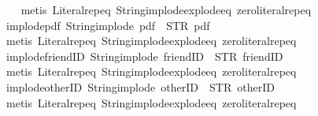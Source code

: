 \begin{isabellebody}
%
\isadelimproof
\ \ %
\endisadelimproof
%
\isatagproof
{}\isamarkupfalse%
\ {\isacharparenleft}metis\ Literal{\isachardot}rep{\isacharunderscore}eq\ String{\isachardot}implode{\isacharunderscore}explode{\isacharunderscore}eq\ zero{\isacharunderscore}literal{\isachardot}rep{\isacharunderscore}eq{\isacharparenright}%
\endisatagproof
{\isafoldproof}%
%
\isadelimproof
\isanewline
%
\endisadelimproof
\isanewline
{}\isamarkupfalse%
\ implode{\isacharunderscore}pdf{\isacharcolon}\ {\isachardoublequoteopen}String{\isachardot}implode\ {\isacharprime}{\isacharprime}pdf{\isacharprime}{\isacharprime}\ {\isacharequal}\ STR\ {\isacharprime}{\isacharprime}pdf{\isacharprime}{\isacharprime}{\isachardoublequoteclose}\isanewline
%
\isadelimproof
\ \ %
\endisadelimproof
%
\isatagproof
{}\isamarkupfalse%
\ {\isacharparenleft}metis\ Literal{\isachardot}rep{\isacharunderscore}eq\ String{\isachardot}implode{\isacharunderscore}explode{\isacharunderscore}eq\ zero{\isacharunderscore}literal{\isachardot}rep{\isacharunderscore}eq{\isacharparenright}%
\endisatagproof
{\isafoldproof}%
%
\isadelimproof
\isanewline
%
\endisadelimproof
\isanewline
{}\isamarkupfalse%
\ implode{\isacharunderscore}friendID{\isacharcolon}\ {\isachardoublequoteopen}String{\isachardot}implode\ {\isacharprime}{\isacharprime}friendID{\isacharprime}{\isacharprime}\ {\isacharequal}\ STR\ {\isacharprime}{\isacharprime}friendID{\isacharprime}{\isacharprime}{\isachardoublequoteclose}\isanewline
%
\isadelimproof
\ \ %
\endisadelimproof
%
\isatagproof
{}\isamarkupfalse%
\ {\isacharparenleft}metis\ Literal{\isachardot}rep{\isacharunderscore}eq\ String{\isachardot}implode{\isacharunderscore}explode{\isacharunderscore}eq\ zero{\isacharunderscore}literal{\isachardot}rep{\isacharunderscore}eq{\isacharparenright}%
\endisatagproof
{\isafoldproof}%
%
\isadelimproof
\isanewline
%
\endisadelimproof
\isanewline
{}\isamarkupfalse%
\ implode{\isacharunderscore}otherID{\isacharcolon}\ {\isachardoublequoteopen}String{\isachardot}implode\ {\isacharprime}{\isacharprime}otherID{\isacharprime}{\isacharprime}\ {\isacharequal}\ STR\ {\isacharprime}{\isacharprime}otherID{\isacharprime}{\isacharprime}{\isachardoublequoteclose}\isanewline
%
\isadelimproof
\ \ %
\endisadelimproof
%
\isatagproof
{}\isamarkupfalse%
\ {\isacharparenleft}metis\ Literal{\isachardot}rep{\isacharunderscore}eq\ String{\isachardot}implode{\isacharunderscore}explode{\isacharunderscore}eq\ zero{\isacharunderscore}literal{\isachardot}rep{\isacharunderscore}eq{\isacharparenright}%

\end{isabellebody}

